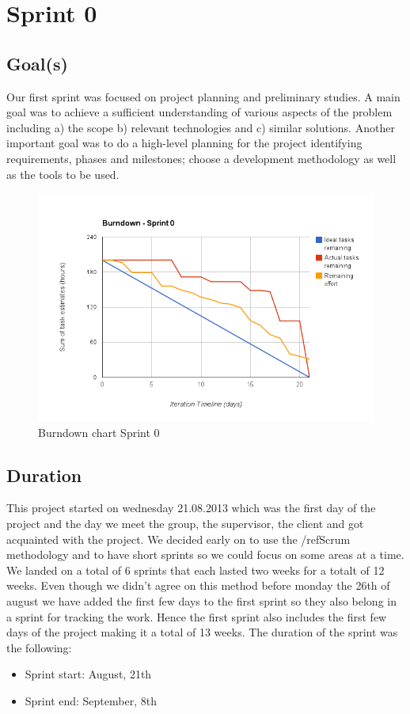 

\chapter{Sprint 0}
\label{Sprint0}

\section{Goal(s)}

Our first sprint was focused on project planning and preliminary studies.
A main goal was to achieve a sufficient understanding of various aspects of the problem
including a) the scope b) relevant technologies and c) similar solutions.
Another important goal was to do a high-level planning for the project identifying requirements,
phases and milestones; choose a development methodology as well as the tools to be used.

\begin{figure}[H]
\centering
\includegraphics[scale=0.50]{../Figures/burndownSprint0.png}
\caption{Burndown chart Sprint 0}
\label{figure:burndownsprint0}
\end{figure}


\section{Duration}
This project started on wednesday 21.08.2013 which was the first day of the project and the day we meet the group, the supervisor, the client and got acquainted with the project. We decided early on to use the /ref{Scrum} methodology and to have short sprints so we could focus on some areas at a time. We landed on a total of 6 sprints that each lasted two weeks for a totalt of 12 weeks. Even though we didn't agree on this method before monday the 26th of august we have added the first few days to the first sprint so they also belong in a sprint for tracking the work. Hence the first sprint also includes the first few days of the project making it a total of 13 weeks. 
The duration of the sprint was the following:
\begin{itemize}
\item Sprint start: August, 21th
\item Sprint end: September, 8th
\end{itemize}

